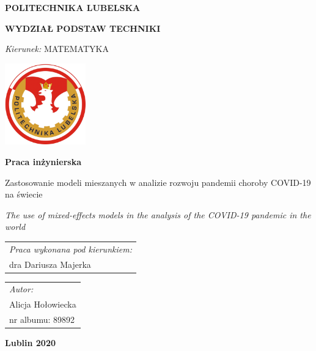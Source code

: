 \documentclass[12pt]{mwbk}
\theoremstyle{plain}
\theoremstyle{definition}
\theoremstyle{remark}
\begin{document}

\thispagestyle{empty}  %


\newcommand\tytul{Zastosowanie modeli mieszanych w analizie rozwoju pandemii choroby COVID-19 na świecie}

\newcommand\tytulangielski{The use of mixed-effects models in the analysis of the COVID-19 pandemic in the world}


\begin{center}


{\large \bf POLITECHNIKA LUBELSKA}

{\bf WYDZIAŁ PODSTAW TECHNIKI}

\emph{Kierunek:} MATEMATYKA


\vfill %
     

\includegraphics[width=3.5cm]{rys/logopl}

\vfill

\textbf{Praca inżynierska}

\vfill
\vfill
\vfill

\large
\tytul

\vfill

\emph{\tytulangielski}


\vfill
\vfill
\vfill
\vfill
\vfill

\begin{tabular}[t]{l}
\emph{Praca wykonana pod kierunkiem:}
\\
dra Dariusza Majerka
\end{tabular}
\hfill
\begin{tabular}[t]{l}
	\emph{Autor:}
\\
Alicja Hołowiecka\\
nr albumu: 89892 
\end{tabular}

\vfill
\vfill
\vfill

\textbf{Lublin 2020}

\end{center}
\end{document}
